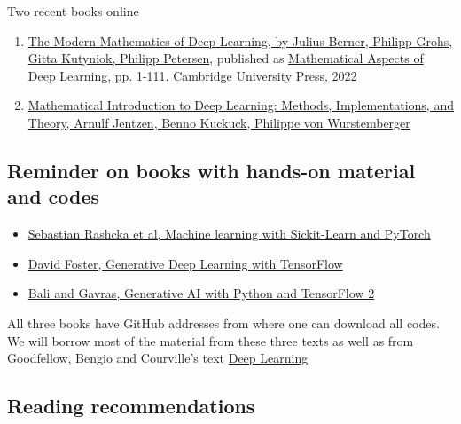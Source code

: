 \documentclass[%
oneside,                 %
final,                   %
10pt]{article}
\begin{document}
\begin{block}{Two recent books online }
\begin{enumerate}
\item \href{{https://arxiv.org/abs/2105.04026}}{The Modern Mathematics of Deep Learning, by Julius Berner, Philipp Grohs, Gitta Kutyniok, Philipp Petersen}, published as \href{{https://doi.org/10.1017/9781009025096.002}}{Mathematical Aspects of Deep Learning, pp. 1-111. Cambridge University Press, 2022}

\item \href{{https://doi.org/10.48550/arXiv.2310.20360}}{Mathematical Introduction to Deep Learning: Methods, Implementations, and Theory, Arnulf Jentzen, Benno Kuckuck, Philippe von Wurstemberger}
\end{enumerate}

\noindent
\end{block}

\subsection{Reminder on books with hands-on material and codes}
\begin{block}{}
\begin{itemize}
\item \href{{https://sebastianraschka.com/blog/2022/ml-pytorch-book.html}}{Sebastian Rashcka et al, Machine learning with Sickit-Learn and PyTorch}

\item \href{{https://www.oreilly.com/library/view/generative-deep-learning/9781098134174/ch01.html}}{David Foster, Generative Deep Learning with TensorFlow}

\item \href{{https://github.com/PacktPublishing/Hands-On-Generative-AI-with-Python-and-TensorFlow-2}}{Bali and Gavras, Generative AI with Python and TensorFlow 2}
\end{itemize}

\noindent
\end{block}

All three books have GitHub addresses from where  one can download all codes. We will borrow most of the material from these three texts as well as 
from Goodfellow, Bengio and Courville's text \href{{https://www.deeplearningbook.org/}}{Deep Learning}

\subsection{Reading recommendations}
\end{document}
